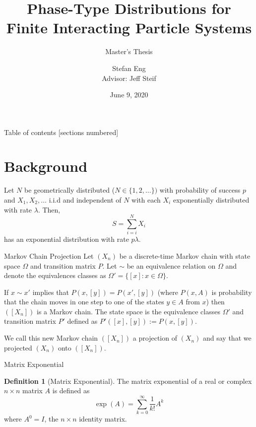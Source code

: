 \documentclass{beamer}
\title{Phase-Type Distributions for Finite Interacting Particle Systems}
\subtitle{Master's Thesis}
\author{Stefan Eng\\
    Advisor: Jeff Steif
}
\institute{Göteborgs Universitet}
\date{June 9, 2020}
\theoremstyle{definition}
\newtheorem{defn}[theorem]{Definition}
\begin{document}
\maketitle

\begin{frame}{Table of contents}
  [sections numbered]
  \tableofcontents%
\end{frame}

\section{Background}

\begin{frame}
    \begin{theorem} \label{thm:geom_sum_exp}
    Let $N$ be geometrically distributed ($N \in \{1,2,\ldots\})$ with probability of success $p$ and $X_1,X_2,\ldots$ i.i.d and independent of $N$ with each $X_i$ exponentially distributed with rate $\lambda$.
    Then,
    $$
    S = \sum_{i = i}^N X_i
    $$
    has an exponential distribution with rate $p \lambda$.
    \end{theorem}
\end{frame}

\begin{frame}{Markov Chain Projection}
Let $(X_n)$ be a discrete-time Markov chain with state space $\Omega$ and transition matrix $P$.
Let $\sim$ be an equivalence relation on $\Omega$ and denote the equivalences classes as $\Omega' = \{[x]: x \in \Omega\}$.

If $x \sim x'$ implies that $P(x,[y]) = P(x', [y])$ (where $P(x,A)$ is probability that the chain moves in one step to one of the states $y \in A$ from $x$) then $([X_n])$  is a Markov chain.
The state space is the equivalence classes $\Omega'$ and transition matrix $P'$ defined as $P'([x],[y]) := P(x, [y])$.

We call this new Markov chain $([X_n])$ a projection of $(X_n)$ and say that we projected $(X_n)$ onto $([X_n])$.
\end{frame}

\begin{frame}{Matrix Exponential}
    
\begin{defn}[Matrix Exponential]
The matrix exponential of a real or complex $n \times n$ matrix $A$ is defined as
$$
\exp(A) = \sum_{k = 0}^\infty \frac{1}{k!} A^k
$$
where $A^0 = I$, the $n \times n$ identity matrix.
\end{defn}
\end{frame}
\end{document}
